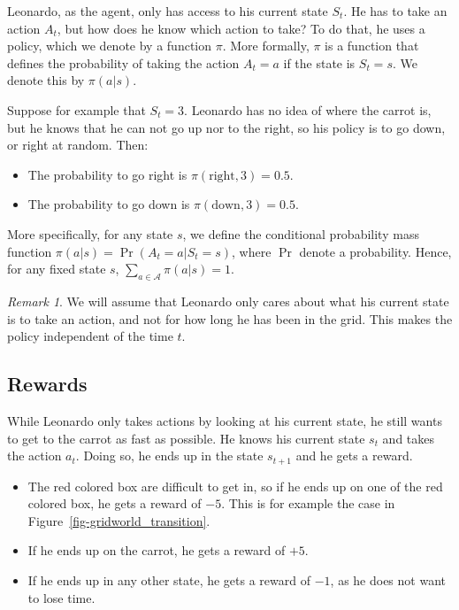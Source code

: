 \documentclass[
  letterpaper,
]{report}
\providecommand{\tightlist}{%
  \setlength{\itemsep}{0pt}\setlength{\parskip}{0pt}}\usepackage{longtable,booktabs,array}
\theoremstyle{definition}
\theoremstyle{plain}
\theoremstyle{definition}
\theoremstyle{remark}
\newtheorem*{remark}{Remark}
\begin{document}
Leonardo, as the agent, only has access to his current state \(S_t\). He
has to take an action \(A_t\), but how does he know which action to
take? To do that, he uses a policy, which we denote by a function
\(\pi\). More formally, \(\pi\) is a function that defines the
probability of taking the action \(A_t = a\) if the state is
\(S_t = s\). We denote this by \(\pi(a|s)\).

Suppose for example that \(S_t = 3\). Leonardo has no idea of where the
carrot is, but he knows that he can not go up nor to the right, so his
policy is to go down, or right at random. Then:

\begin{itemize}
\tightlist
\item
  The probability to go right is \(\pi(\text{right}, 3) = 0.5\).
\item
  The probability to go down is \(\pi(\text{down}, 3) = 0.5\).
\end{itemize}

More specifically, for any state \(s\), we define the conditional
probability mass function \(\pi(a|s) = \Pr(A_t = a | S_t = s)\), where
\(\Pr\) denote a probability. Hence, for any fixed state \(s\),
\(\sum_{a\in\mathcal{A}} \pi(a|s) = 1\).

\begin{remark}
We will assume that Leonardo only cares about what his current state is
to take an action, and not for how long he has been in the grid. This
makes the policy independent of the time \(t\).
\end{remark}

\subsection{Rewards}\label{rewards}

While Leonardo only takes actions by looking at his current state, he
still wants to get to the carrot as fast as possible. He knows his
current state \(s_t\) and takes the action \(a_t\). Doing so, he ends up
in the state \(s_{t+1}\) and he gets a reward.

\begin{itemize}
\tightlist
\item
  The red colored box are difficult to get in, so if he ends up on one
  of the red colored box, he gets a reward of \(-5\). This is for
  example the case in Figure~\ref{fig-gridworld_transition}.
\item
  If he ends up on the carrot, he gets a reward of \(+5\).
\item
  If he ends up in any other state, he gets a reward of \(-1\), as he
  does not want to lose time.
\end{itemize}
\end{document}
